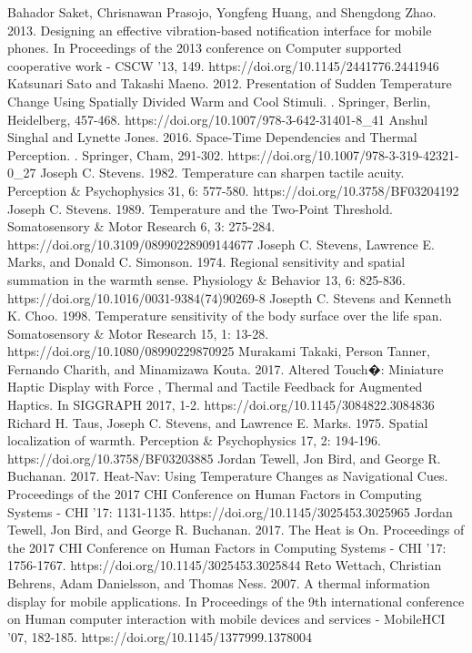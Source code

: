 \documentclass[preprint,12pt]{elsarticle}
\begin{document}
\begin{thebibliography}{00}
Bahador Saket, Chrisnawan Prasojo, Yongfeng Huang, and Shengdong Zhao. 2013. Designing an effective vibration-based notification interface for mobile phones. In Proceedings of the 2013 conference on Computer supported cooperative work - CSCW '13, 149. https://doi.org/10.1145/2441776.2441946
Katsunari Sato and Takashi Maeno. 2012. Presentation of Sudden Temperature Change Using Spatially Divided Warm and Cool Stimuli. . Springer, Berlin, Heidelberg, 457-468. https://doi.org/10.1007/978-3-642-31401-8\_41
Anshul Singhal and Lynette Jones. 2016. Space-Time Dependencies and Thermal Perception. . Springer, Cham, 291-302. https://doi.org/10.1007/978-3-319-42321-0\_27
Joseph C. Stevens. 1982. Temperature can sharpen tactile acuity. Perception \& Psychophysics 31, 6: 577-580. https://doi.org/10.3758/BF03204192
Joseph C. Stevens. 1989. Temperature and the Two-Point Threshold. Somatosensory \& Motor Research 6, 3: 275-284. https://doi.org/10.3109/08990228909144677
Joseph C. Stevens, Lawrence E. Marks, and Donald C. Simonson. 1974. Regional sensitivity and spatial summation in the warmth sense. Physiology \& Behavior 13, 6: 825-836. https://doi.org/10.1016/0031-9384(74)90269-8
Josepth C. Stevens and Kenneth K. Choo. 1998. Temperature sensitivity of the body surface over the life span. Somatosensory \& Motor Research 15, 1: 13-28. https://doi.org/10.1080/08990229870925
Murakami Takaki, Person Tanner, Fernando Charith, and Minamizawa Kouta. 2017. Altered Touch�: Miniature Haptic Display with Force , Thermal and Tactile Feedback for Augmented Haptics. In SIGGRAPH 2017, 1-2. https://doi.org/10.1145/3084822.3084836
Richard H. Taus, Joseph C. Stevens, and Lawrence E. Marks. 1975. Spatial localization of warmth. Perception \& Psychophysics 17, 2: 194-196. https://doi.org/10.3758/BF03203885
Jordan Tewell, Jon Bird, and George R. Buchanan. 2017. Heat-Nav: Using Temperature Changes as Navigational Cues. Proceedings of the 2017 CHI Conference on Human Factors in Computing Systems - CHI '17: 1131-1135. https://doi.org/10.1145/3025453.3025965
Jordan Tewell, Jon Bird, and George R. Buchanan. 2017. The Heat is On. Proceedings of the 2017 CHI Conference on Human Factors in Computing Systems - CHI '17: 1756-1767. https://doi.org/10.1145/3025453.3025844
Reto Wettach, Christian Behrens, Adam Danielsson, and Thomas Ness. 2007. A thermal information display for mobile applications. In Proceedings of the 9th international conference on Human computer interaction with mobile devices and services - MobileHCI '07, 182-185. https://doi.org/10.1145/1377999.1378004

\end{thebibliography}
\end{document}
